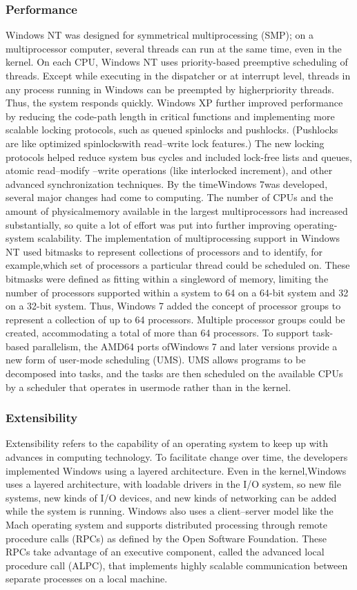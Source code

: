 \documentclass[12pt]{article}
\begin{document}
\subsubsection*{Performance}
Windows NT was designed for symmetrical multiprocessing (SMP); on a
multiprocessor computer, several threads can run at the same time, even in the
kernel. On each CPU, Windows NT uses priority-based preemptive scheduling
of threads. Except while executing in the dispatcher or at interrupt level,
threads in any process running in Windows can be preempted by higherpriority
threads. Thus, the system responds quickly.
Windows XP further improved performance by reducing the code-path
length in critical functions and implementing more scalable locking protocols,
such as queued spinlocks and pushlocks. (Pushlocks are like optimized spinlockswith
read–write lock features.) The new locking protocols helped reduce
system bus cycles and included lock-free lists and queues, atomic read–modify
–write operations (like interlocked increment), and other advanced synchronization
techniques. By the timeWindows 7was developed, several major changes had come to
computing. The number of CPUs and the amount of physicalmemory available
in the largest multiprocessors had increased substantially, so quite a lot of effort
was put into further improving operating-system scalability.
The implementation of multiprocessing support in Windows NT used bitmasks
to represent collections of processors and to identify, for example,which
set of processors a particular thread could be scheduled on. These bitmasks
were defined as fitting within a singleword of memory, limiting the number of
processors supported within a system to 64 on a 64-bit system and 32 on a 32-bit
system. Thus, Windows 7 added the concept of processor groups to represent
a collection of up to 64 processors. Multiple processor groups could be created,
accommodating a total of more than 64 processors. To support task-based parallelism, the AMD64 ports ofWindows 7 and later
versions provide a new form of user-mode scheduling (UMS). UMS allows
programs to be decomposed into tasks, and the tasks are then scheduled on
the available CPUs by a scheduler that operates in usermode rather than in the
kernel.
\subsubsection*{Extensibility}
Extensibility refers to the capability of an operating system to keep up with
advances in computing technology. To facilitate change over time, the developers
implemented Windows using a layered architecture. Even in the kernel,Windows uses a layered architecture, with loadable
drivers in the I/O system, so new file systems, new kinds of I/O devices, and
new kinds of networking can be added while the system is running. Windows also uses a client–server model like the Mach operating system
and supports distributed processing through remote procedure calls (RPCs) as
defined by the Open Software Foundation. These RPCs take advantage of an
executive component, called the advanced local procedure call (ALPC), that
implements highly scalable communication between separate processes on a
local machine.
\end{document}
